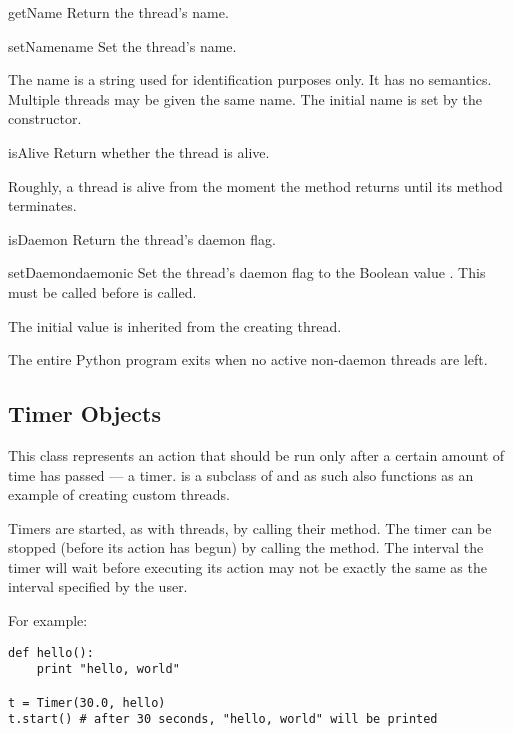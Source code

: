 \begin{methoddesc}{getName}{}
Return the thread's name.
\end{methoddesc}

\begin{methoddesc}{setName}{name}
Set the thread's name.

The name is a string used for identification purposes only.
It has no semantics.  Multiple threads may be given the same
name.  The initial name is set by the constructor.
\end{methoddesc}

\begin{methoddesc}{isAlive}{}
Return whether the thread is alive.

Roughly, a thread is alive from the moment the  method
returns until its  method terminates.
\end{methoddesc}

\begin{methoddesc}{isDaemon}{}
Return the thread's daemon flag.
\end{methoddesc}

\begin{methoddesc}{setDaemon}{daemonic}
Set the thread's daemon flag to the Boolean value .
This must be called before  is called.

The initial value is inherited from the creating thread.

The entire Python program exits when no active non-daemon
threads are left.
\end{methoddesc}


\subsection{Timer Objects \label{timer-objects}}

This class represents an action that should be run only after a
certain amount of time has passed --- a timer.   is a
subclass of  and as such also functions as an example of
creating custom threads.

Timers are started, as with threads, by calling their 
method.  The timer can be stopped (before its action has begun) by
calling the  method.  The interval the timer will
wait before executing its action may not be exactly the same as the
interval specified by the user.

For example:
\begin{verbatim}
def hello():
    print "hello, world"

t = Timer(30.0, hello)
t.start() # after 30 seconds, "hello, world" will be printed
\end{verbatim}

